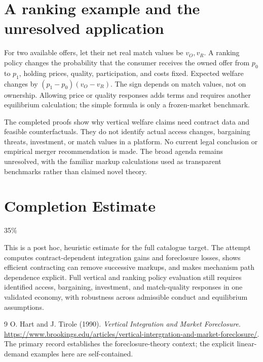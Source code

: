 \documentclass[11pt,a4paper]{article}
\begin{document}
\section{A ranking example and the unresolved application}
For two available offers, let their net real match values be $v_O,v_R$. A ranking policy changes the probability that the consumer receives the owned offer from $p_0$ to $p_1$, holding prices, quality, participation, and costs fixed. Expected welfare changes by $(p_1-p_0)(v_O-v_R)$. The sign depends on match values, not on ownership. Allowing price or quality responses adds terms and requires another equilibrium calculation; the simple formula is only a frozen-market benchmark.

The completed proofs show why vertical welfare claims need contract data and feasible counterfactuals. They do not identify actual access changes, bargaining threats, investment, or match values in a platform. No current legal conclusion or empirical merger recommendation is made. The broad agenda remains unresolved, with the familiar markup calculations used as transparent benchmarks rather than claimed novel theory.

\section{Completion Estimate}
35\%

This is a post hoc, heuristic estimate for the full catalogue target.
The attempt computes contract-dependent integration gains and foreclosure losses, shows efficient contracting can remove successive markups, and makes mechanism path dependence explicit. Full vertical and ranking policy evaluation still requires identified access, bargaining, investment, and match-quality responses in one validated economy, with robustness across admissible conduct and equilibrium assumptions.

\begin{thebibliography}{9}
 O. Hart and J. Tirole (1990). \emph{Vertical Integration and Market Foreclosure}.
\url{https://www.brookings.edu/articles/vertical-intergration-and-market-foreclosure/}.
The primary record establishes the foreclosure-theory context; the explicit linear-demand examples here are self-contained.
\end{thebibliography}
\end{document}

